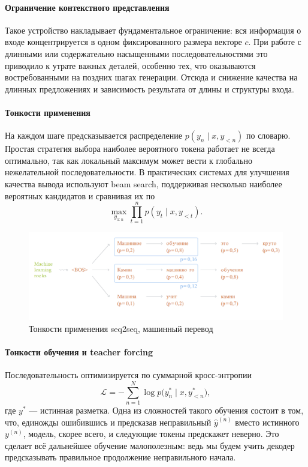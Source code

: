\documentclass[12pt,a4paper]{article}
\begin{document}
\paragraph{Ограничение контекстного представления}
Такое устройство накладывает фундаментальное ограничение: вся информация о входе концентрируется в одном фиксированного размера векторе $c$. При работе с длинными или содержательно насыщенными последовательностями это приводило к утрате важных деталей, особенно тех, что оказываются востребованными на поздних шагах генерации. Отсюда и снижение качества на длинных предложениях и зависимость результата от длины и структуры входа.

\paragraph{Тонкости применения}
На каждом шаге предсказывается распределение $p(y_n \mid x, y_{<n})$ по словарю. Простая стратегия выбора наиболее вероятного токена работает не всегда оптимально, так как локальный максимум может вести к глобально нежелательной последовательности. В практических системах для улучшения качества вывода используют beam search, поддерживая несколько наиболее вероятных кандидатов и сравнивая их по
\[
\max_{y_{1:n}} \prod_{t=1}^{n} p(y_t \mid x, y_{<t}).
\]

\begin{figure}[h]
  \centering
  \includegraphics[width=0.70\linewidth]{Seq2Seq.png}
  \caption{Тонкости применения seq2seq, машинный перевод}
\end{figure}

\paragraph{Тонкости обучения и teacher forcing}
Последовательность оптимизируется по суммарной кросс-энтропии
\[
\mathcal{L} = -\sum_{n=1}^{N} \log p\bigl(y^{\ast}_n \mid x, y^{\ast}_{<n}\bigr),
\]
где $y^{\ast}$ — истинная разметка.
Одна из сложностей такого обучения состоит в том, что, единожды ошибившись и предсказав неправильный
$\hat{y}^{(n)}$
вместо истинного
$y^{(n)}$,
модель, скорее всего, и следующие токены предскажет неверно. Это сделает всё дальнейшее обучение малополезным: ведь мы будем учить декодер предсказывать правильное продолжение неправильного начала.
\end{document}
